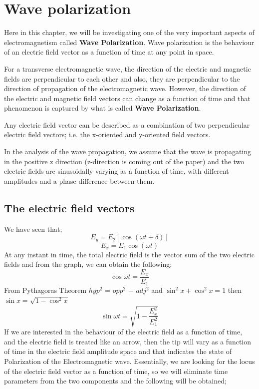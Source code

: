 \chapter{Wave polarization}\label{lec:lec23}
Here in this chapter, we will be investigating one of the very important aspects of electromagnetism called \textbf{Wave Polarization}. Wave polarization is the behaviour of an electric field vector as a function of time at any point in space.

For a transverse electromagnetic wave, the direction of the electric and magnetic fields are perpendicular to each other and also, they are perpendicular to the direction of propagation of the electromagnetic wave. However, the direction of the electric and magnetic field vectors can change as a function of time and that phenomenon is captured by what is called \textbf{Wave Polarization}.

Any electric field vector can be described as a combination of two perpendicular electric field vectors; i.e. the x-oriented and y-oriented field vectors. 

In the analysis of the wave propagation, we assume that the wave is propagating in the positive z direction (z-direction is coming out of the paper) and the two electric fields are sinusoidally varying as a function of time, with different amplitudes and a phase difference between them.	

\section{The electric field vectors} 
We have seen that;
\begin{equation}
E_y = E_2 [\cos(\omega t + \delta)]
\end{equation}
\begin{equation}
E_x = E_1 \cos(\omega t)
\end{equation}
At any instant in time, the total electric field is the vector sum of the two electric  fields and from the graph, we can obtain the following;
\begin{equation}
\cos {\omega t} = \frac {E_x}{E_1} 
\end{equation}
From Pythagoras Theorem $hyp^2$ = $opp^2$ + $adj^2$ and $\sin^2 x + \cos^2 x = 1$ then $\sin x = \sqrt{1-\cos^ 2x}$
\begin{equation}
\sin {\omega t} = \sqrt{1 - \frac{E_{x}^2}{E_{1}^2}}
\end{equation}
If we are interested in the behaviour of the electric field as a function of time, and the electric field is treated like an arrow, then the tip will vary as a function of time in the electric field amplitude space and that indicates the state of Polarization of the Electromagnetic wave. Essentially, we are looking for the locus of the electric field vector as a function of time, so we will eliminate time parameters from the two components and the following will be obtained;

